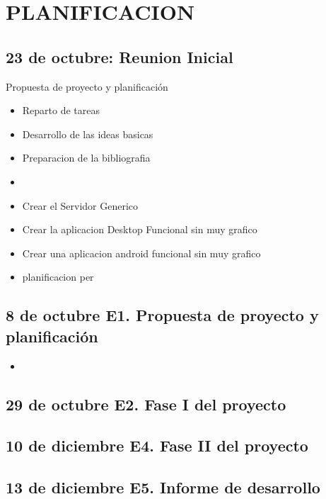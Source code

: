 \documentclass{article}
\theoremstyle{definition}
\begin{document}
\section{PLANIFICACION}






\subsection{23 de octubre: Reunion Inicial}

Propuesta de proyecto y planificación

\begin{itemize}
    \item Reparto de tareas
    \item Desarrollo de las ideas basicas
    \item Preparacion de la bibliografia
    \item 
\end{itemize}

\begin{itemize}
    \item Crear el Servidor Generico
    \item Crear la aplicacion Desktop Funcional sin muy grafico
    \item Crear una aplicacion android funcional sin muy grafico
    \item planificacion per
\end{itemize}

\subsection{8 de octubre	E1. Propuesta de proyecto y planificación }
\begin{itemize}
    \item 
\end{itemize}
\subsection{29 de octubre	E2. Fase I del proyecto}
\subsection{10 de diciembre	E4. Fase II del proyecto}
\subsection{13 de diciembre	E5. Informe de desarrollo}
\end{document}
